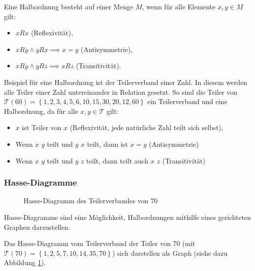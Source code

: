 \documentclass{scrartcl}
\begin{document}
Eine Halbordnung besteht auf einer Menge $M$, wenn für alle Elemente $x, y \in M$
gilt:

\begin{itemize}
	\item $xRx$ (Reflexivität),
	\item $xRy \wedge yRx \implies x = y$ (Antisymmetrie),
	\item $xRy \wedge yRz \implies xRz$ (Transitivität).
\end{itemize}

Beispiel für eine Halbordnung ist der Teilerverband einer Zahl. In diesem
werden alle Teiler einer Zahl untereinander in Relation gesetzt. So sind
die Teiler von 
$\mathcal{T}(60) = \left\{1, 2, 3, 4, 5, 6, 10, 15, 30, 20, 12, 60\right\}$ 
ein Teilerverband und eine Halbordnung, da für alle $x, y \in \mathcal{T}$ gilt:

\begin{itemize}
	\item $x$ ist Teiler von $x$ (Reflexivität, jede natürliche Zahl teilt sich
		selbst),
	\item Wenn $x$ $y$ teilt und $y$ $x$ teilt, dann ist $x = y$ (Antisymmetrie)
	\item Wenn $x$ $y$ teilt und $y$ $z$ teilt, dann teilt auch 
		$x$ $z$ (Transitivität)
\end{itemize}

\subsubsection{Hasse-Diagramme}


\begin{figure}
	\centering
	\caption{Hasse-Diagramm des Teilerverbandes von 70}
	\label{hasse}
\end{figure}

Hasse-Diagramme sind eine Möglichkeit, Halbordnungen mithilfe eines
gerichteten Graphen darzustellen. 

Das Hasse-Diagramm vom Teilerverband der Teiler von 70 (mit 
$\mathcal{T}(70) = \left\{1, 2, 5, 7, 10, 14, 35, 70\right\}$) sich darstellen als
Graph (siehe dazu Abbildung \ref{hasse}).
\end{document}
